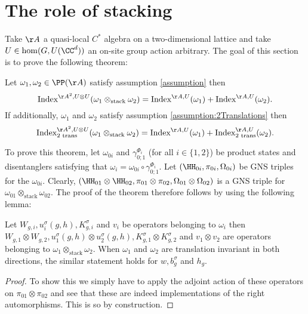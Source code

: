 \section{The role of stacking}\label{sec:the-role-of-stacking}
Take $\AA$ a quasi-local $C^*$ algebra on a two-dimensional lattice and take $U\in\hom(G,U(\CC^d))$ an on-site group action arbitrary. The goal of this section is to prove the following theorem:
\begin{theorem}\label{th:IndexMorphismUnderStacking}
	Let $\omega_1,\omega_2\in\PP(\AA)$ satisfy assumption \ref{assumption} then
	\begin{equation}\label{eq:IndexMorphismUnderStacking}
		\textrm{Index}^{\AA^2,U\otimes U}(\omega_1\otimes_{\text{stack}}\omega_2)=\textrm{Index}^{\AA,U}(\omega_1)+\textrm{Index}^{\AA,U}(\omega_2).
	\end{equation}
	If additionally, $\omega_1$ and $\omega_2$ satisfy assumption \ref{assumption:2Translations} then
	\begin{equation}\label{eq:IndexMorphismUnderStackingTwoTranslations}
		\textrm{Index}^{\AA^2,U\otimes U}_{\text{2 trans}}(\omega_1\otimes_{\text{stack}}\omega_2)=\textrm{Index}^{\AA,U}(\omega_1)+\textrm{Index}^{\AA,U}_{\text{2 trans}}(\omega_2).
	\end{equation}
\end{theorem}
To prove this theorem, let $\omega_{0i}$ and $\gamma_{0;1}^{\Phi_i}$ (for all $i\in\{1,2\}$) be product states and disentanglers satisfying that $\omega_i=\omega_{0i}\circ\gamma_{0;1}^{\Phi_i}$. Let $(\HH_{0i},\pi_{0i},\Omega_{0i})$ be GNS triples for the $\omega_{0i}$. Clearly, $(\HH_{01}\otimes\HH_{02},\pi_{01}\otimes\pi_{02},\Omega_{01}\otimes\Omega_{02})$ is a GNS triple for $\omega_{01}\otimes_{\text{stack}}\omega_{02}$. The proof of the theorem therefore follows by using the following lemma:
\begin{lemma}
	Let $W_{g,i},u^\sigma_i(g,h),K_{g,i}^\sigma$ and $v_{i}$ be operators belonging to $\omega_i$ then $W_{g,1}\otimes W_{g,2},u^\sigma_1(g,h)\otimes u^\sigma_2(g,h),K_{g,1}^\sigma\otimes K_{g,2}^\sigma$ and $v_{1}\otimes v_{2}$ are operators belonging to $\omega_1\otimes_{\text{stack}}\omega_2$. When $\omega_1$ and $\omega_2$ are translation invariant in both directions, the similar statement holds for $w,b_g^\sigma$ and $h_g$.
\end{lemma}
\begin{proof}
	To show this we simply have to apply the adjoint action of these operators on $\pi_{01}\otimes\pi_{02}$ and see that these are indeed implementations of the right automorphisms. This is so by construction.
\end{proof}
